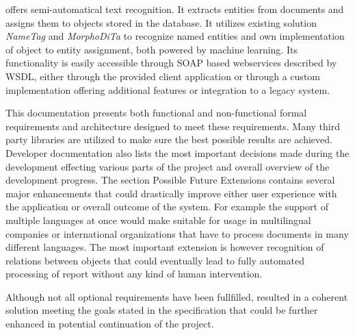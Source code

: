 
\textan{} offers semi-automatical text recognition. It extracts entities from
documents and assigns them to objects stored in the database. It utilizes existing
solution \emph{NameTag} and \emph{MorphoDiTa} to recognize named entities and own
implementation of object to entity assignment, both powered by machine learning.
Its functionality is easily accessible through SOAP based webservices described by
WSDL, either through the provided client application or through a custom
implementation offering additional features or integration to a legacy system.

This documentation presents both functional and non-functional formal
requirements and architecture designed to meet these requirements. Many third
party libraries are utilized to make sure the best possible results are achieved.
Developer documentation also lists the most important decisions made during the
development effecting various parts of the project and overall overview of the
development progress. The section Possible Future Extensions contains several
major enhancements that could drastically improve either user experience with the
application or overall outcome of the system. For example the support of multiple
languages at once would make \textan{} suitable for usage in multilingual
companies or international organizations that have to process documents in many
different languages. The most important extension is however recognition of
relations between objects that could eventually lead to fully automated
processing of report without any kind of human intervention.

Although not all optional requirements have been fullfilled, \textan{}
resulted in a coherent solution meeting the goals stated in the specification
that could be further enhanced in potential continuation of the project.
